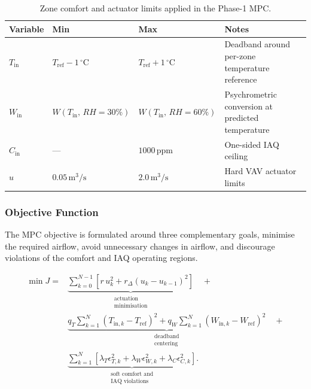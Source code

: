 \documentclass[12pt, a4paper]{article}
\begin{document}
	
	\begin{table}[ht]
		\centering
		\caption{Zone comfort and actuator limits applied in the Phase-1 MPC.}
		\label{tab:MPC_zone_limits}
		\begin{tabular}{llll}
			\toprule
			\textbf{Variable} & \textbf{Min} & \textbf{Max} & \textbf{Notes} \\
			\midrule
			$T_{\mathrm{in}}$
			& $T_{\mathrm{ref}} - 1\,^{\circ}\mathrm{C}$
			& $T_{\mathrm{ref}} + 1\,^{\circ}\mathrm{C}$
			& Deadband around per-zone temperature reference \\[4pt]
			$W_{\mathrm{in}}$
			& $W(T_{\mathrm{in}},\,RH=30\%)$
			& $W(T_{\mathrm{in}},\,RH=60\%)$
			& Psychrometric conversion at predicted temperature \\[4pt]
			$C_{\mathrm{in}}$
			& ---
			& $1000\,\mathrm{ppm}$
			& One-sided IAQ ceiling \\[4pt]
			$u$
			& $0.05\,\mathrm{m^3/s}$
			& $2.0\,\mathrm{m^3/s}$
			& Hard VAV actuator limits \\
			\bottomrule
		\end{tabular}
	\end{table}
	
	
	\subsubsection{Objective Function}
	
	The MPC objective is formulated around three complementary goals, minimise the required airflow, avoid unnecessary changes in airflow, and discourage violations of the comfort and IAQ operating regions.
	
	\begin{equation}
		\begin{aligned}
			\min J ={}&
			\underbrace{
				\sum_{k=0}^{N-1}
				\left[
				r\,u_k^2+
				r_{\Delta}(u_k-u_{k-1})^2
				\right] 
			}_{\substack{\text{actuation}\\\text{minimisation}}} 
			\quad+
			\\[6pt]
			&
			\underbrace{
				q_T\sum_{k=1}^{N}
				(T_{\mathrm{in},k}-T_{\mathrm{ref}})^2
				+
				q_W\sum_{k=1}^{N}
				(W_{\mathrm{in},k}-W_{\mathrm{ref}})^2
			}_{\substack{\text{deadband}\\\text{centering}}}
			\quad+
			\\[6pt]
			&
			\underbrace{
				\sum_{k=1}^{N}
				\left[
				\lambda_T\epsilon_{T,k}^2+
				\lambda_W\epsilon_{W,k}^2+
				\lambda_C\epsilon_{C,k}^2
				\right]
			}_{\substack{\text{soft comfort and}\\\text{IAQ violations}}}.
		\end{aligned}
		\label{eq:MPC_objective}
	\end{equation}
	
\end{document}
